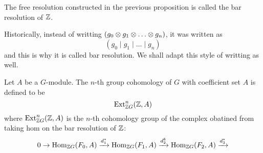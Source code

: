 \begin{defn} 
    The free resolution constructed in the previous proposition is called the bar resolution of ${\mathbb Z}$.
\end{defn}

\medskip

\begin{re}
    Historically, instead of writting $(g_0 \ten g_1 \ten \dots \ten g_n)$, it was written as 
    \[(g_0 \mid g_1 \mid \dots \mid g_n)\]
    and this is why it is called bar resolution. We shall adapt this style of writting as well.
\end{re}

\medskip

\begin{defn} 
    Let $A$ be a $G$-module. The $n$-th group cohomology of $G$ with coefficient set $A$ is defined to be
    \[\operatorname{Ext}_{{\mathbb Z} G}^n ({\mathbb Z}, A)\]
    where $\operatorname{Ext}_{{\mathbb Z} G}^n ({\mathbb Z}, A)$ is the $n$-th cohomology group of the complex obatined from taking hom on the bar resolution of ${\mathbb Z}$:
    \[0 \to \operatorname{Hom}_{{\mathbb Z} G}(F_0, A) \xrightarrow{d_1^*} \operatorname{Hom}_{{\mathbb Z} G}(F_1, A) \xrightarrow{d_2^8} \operatorname{Hom}_{{\mathbb Z} G}(F_2, A) \xrightarrow{d_3^*}\]
\end{defn}
